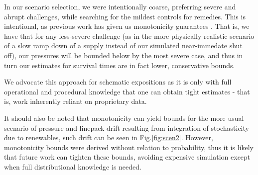 In our scenario selection, we were intentionally coarse, preferring severe and abrupt challenges, while searching for the mildest controls for remedies. This is intentional, as previous work has given us monotonicity guarantees \cite{Vuffray2015Monotonicity,zlotnik_monotonicity_2016}. That is, we have that for any less-severe challenge (as in the more physically realistic scenario of a slow ramp down of a supply instead of our simulated near-immedate shut off), our pressures will be bounded below by the most severe case, and thus in turn our estimates for survival times are in fact lower, conservative bounds.

We advocate this approach for schematic expositions as it is only with full operational and procedural knowledge that one can obtain tight estimates - that is, work inherently reliant on proprietary data.

It should also be noted that monotonicity can yield bounds for the more usual scenario of pressure and linepack drift resulting from integration of stochasticity due to renewables, such drift can be seen in  Fig.\ref{fig:scen2}. However, monotonicity bounds were derived without relation to probability, thus it is likely that future work can tighten these bounds, avoiding expensive simulation except when full distributional knowledge is needed.

\begin{comment}
\misha{I suggest to also add here discussion of monotonicity. Specifically, we would like to state what it means, with reference to \cite{Vuffray2015Monotonicity,zlotnik_monotonicity_2016}, and then explain that it allows to generalize results of the use-cases just discussed significantly. Explain (on examples) that the monotonicity guarantees, in particular, that the reserve time estimated for a "larger insult" is shorter than the reserve time of a "smaller" insult. Criston, please extend this part.  Do we need an extra figure to illustrate it?}
\end{comment}